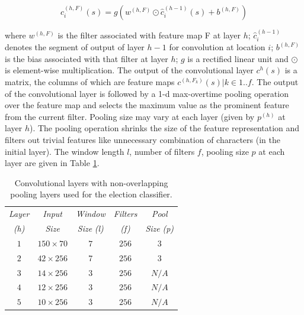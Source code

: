 \documentclass[letterpaper]{article}
\begin{document}
\begin{equation}\label{conv}c_i^{(h,F)}(s)=g(w^{(h,F)}\odot \hat{c}_i^{(h-1)}(s)+b^{(h,F)})
\end{equation}

where
$w^{(h,F)}$ is the filter associated with feature map F at layer $h$;
$\hat{c}_i^{(h-1)}$ denotes the segment of output of layer $h-1$ for convolution at location $i$; $b^{(h,F)}$ is the bias associated with that filter at layer $h$; $g$ is a rectified linear unit and $\odot$ is element-wise multiplication. The output of the convolutional layer $c^h(s)$ is a matrix, the columns of which are feature maps $c^{(h,F_k)}(s)  \vert  k \in 1..f$. The output of the convolutional layer is followed by a 1-d max-overtime pooling operation \cite{collobert2011natural} over the feature map and selects the maximum value as the prominent feature from the current filter. Pooling size may vary at each layer (given by $p^{(h)}$ at layer $h$). The pooling operation shrinks the size of the feature representation and filters out trivial features like unnecessary combination of characters (in the initial layer). The window length $l$, number of filters $f$, pooling size $p$ at each layer are given in Table \ref{layers}.


\begin{table}[h]%
\centering
\small
\begin{tabular}{ |c|c|c|c|c| }
\hline %
 \emph{Layer} & \emph{Input}  & \emph{Window}  & \emph{Filters} & \emph{Pool}  \\
\emph{(h)}& \emph{Size} & \emph{Size} \emph{(l)} & \emph{(f)}& \emph{Size} \emph{(p)} \\\hline %
$1$ & $150\times 70$ & $7$ & $256$ & $3$ \\\hline
$2$ &$42\times 256$ &7 &$256$ & $3$ \\\hline
$3$& $14\times 256$ &  $3$ & $256$ & $N/A$\\\hline
$4$ & $12\times 256$ &$3$ & $256$ & $N/A$ \\\hline
$5$& $10\times 256$ &$3$ & $256$ & $N/A$ \\\hline
\end{tabular}
\caption{Convolutional layers with non-overlapping pooling layers used for the election classifier.}
\label{layers} %
\end{table}
\end{document}
